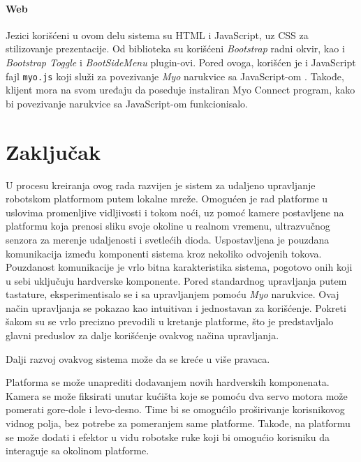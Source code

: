 \documentclass[12pt,a4paper]{report}
\begin{document}
\subsubsection{Web}

Jezici korišćeni u ovom delu sistema su HTML i JavaScript, uz CSS za stilizovanje prezentacije. Od biblioteka su korišćeni \emph{Bootstrap} \cite{bootstrap} radni okvir, kao i \emph{Bootstrap Toggle} \cite{bootstrap_toggle} i \emph{BootSideMenu} \cite{bootsidemenu} plugin-ovi. Pored ovoga, korišćen je i JavaScript fajl \texttt{myo.js} koji služi za povezivanje \textit{Myo} narukvice sa JavaScript-om \cite{myojs}. Takođe, klijent mora na svom uređaju da poseduje instaliran Myo Connect program, kako bi povezivanje narukvice sa JavaScript-om funkcionisalo.

\newpage

\chapter{Zaključak}
U procesu kreiranja ovog rada razvijen je sistem za udaljeno upravljanje robotskom platformom putem lokalne mreže. Omogućen je rad platforme u uslovima promenljive vidljivosti i tokom noći, uz pomoć kamere postavljene na platformu koja prenosi sliku svoje okoline u realnom vremenu, ultrazvučnog senzora za merenje udaljenosti i svetlećih dioda. Uspostavljena je pouzdana komunikacija između komponenti sistema kroz nekoliko odvojenih tokova. Pouzdanost komunikacije je vrlo bitna karakteristika sistema, pogotovo onih koji u sebi uključuju hardverske komponente. Pored standardnog upravljanja putem tastature, eksperimentisalo se i sa upravljanjem pomoću \textit{Myo} narukvice. Ovaj način upravljanja se pokazao kao intuitivan i jednostavan za korišćenje. Pokreti šakom su se vrlo precizno prevodili u kretanje platforme, što je predstavljalo glavni preduslov za dalje korišćenje ovakvog načina upravljanja.

Dalji razvoj ovakvog sistema može da se kreće u više pravaca.

Platforma se može unaprediti dodavanjem novih hardverskih komponenata. Kamera se može fiksirati unutar kućišta koje se pomoću dva servo motora može pomerati gore-dole i levo-desno. Time bi se omogućilo proširivanje korisnikovog vidnog polja, bez potrebe za pomeranjem same platforme. Takođe, na platformu se može dodati i efektor u vidu robotske ruke koji bi omogućio korisniku da interaguje sa okolinom platforme. 
\end{document}
